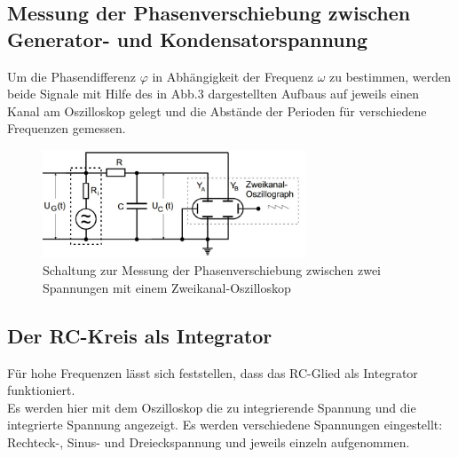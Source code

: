 \subsection{Messung der Phasenverschiebung zwischen Generator- und Kondensatorspannung}

Um die Phasendifferenz $\varphi$ in Abhängigkeit der Frequenz $\omega$
zu bestimmen, werden beide Signale mit Hilfe des in Abb.3 dargestellten Aufbaus auf jeweils einen Kanal am Oszilloskop gelegt und die Abstände der Perioden für verschiedene Frequenzen gemessen.
\begin{figure}[h]
  \centering
  \includegraphics[width=0.7\textwidth]{Grafiken/V353_Abb3.jpg}
  \caption{Schaltung zur Messung der Phasenverschiebung zwischen zwei Spannungen mit einem Zweikanal-Oszilloskop}
  \label{fig:V353_Abb3}
\end{figure}
\subsection{Der RC-Kreis als Integrator}
Für hohe Frequenzen lässt sich feststellen, dass das RC-Glied als Integrator funktioniert.\\
Es werden hier mit dem Oszilloskop die zu integrierende Spannung und die integrierte Spannung angezeigt. Es werden verschiedene Spannungen
eingestellt: Rechteck-, Sinus- und Dreieckspannung und jeweils einzeln aufgenommen.
